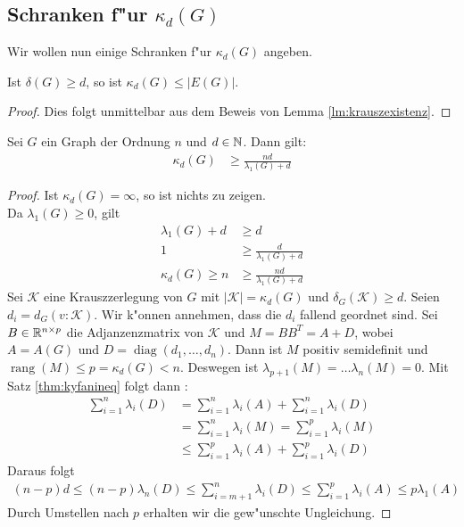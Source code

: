 \subsection{Schranken f"ur $\kappa_d(G)$}

Wir wollen nun einige Schranken f"ur $\kappa_{d}(G)$ angeben. 
\begin{lemma}
  Ist $\delta(G) \geq d$, so ist $\kappa_{d}(G) \leq |E(G)|$. 
\end{lemma}
\begin{proof}
  Dies folgt unmittelbar aus dem Beweis von Lemma \ref{lm:krauszexistenz}. 
\end{proof}

\begin{theorem}
  Sei $G$ ein Graph der Ordnung $n$ und $d\in {\mathbb{N}}$. Dann gilt:
  \begin{align*}
    \kappa_{d}(G) &\geq \frac{nd}{\lambda_{1}(G) +d} 
  \end{align*}
  \label{thm:kappaineq1}
\end{theorem}

\begin{proof}
  Ist $\kappa_{d}(G) = \infty$, so ist nichts zu zeigen. \\
   Da $\lambda_{1}(G) \geq 0$, gilt 
  \begin{align*}
    \lambda_{1}(G) + d &\geq d \\
    1 &\geq \frac{d}{\lambda_{1}(G) + d }\\
    \kappa_{d}(G) \geq n &\geq \frac{nd}{\lambda_{1}(G)+d}
  \end{align*}
  Sei $\mathcal{K}$ eine Krauszzerlegung von $G$ mit $|\mathcal{K}| = \kappa_{d}(G)$ und $\delta_{G}(\mathcal{K}) \geq d$. Seien $d_{i} = d_{G}(v:\mathcal{K})$. Wir k"onnen annehmen, dass die $d_{i}$ fallend geordnet sind. Sei $B\in {\mathbb{R}}^{n\times p}$ die Adjanzenzmatrix von $\mathcal{K}$ und $M = BB^{T} = A+D$, wobei $A= A(G)$ und $D = \operatorname{diag}(d_{1},\dots,d_n)$.
  Dann ist $M$ positiv semidefinit und $\operatorname{rang} (M) \leq p = \kappa_{d}(G) < n $. Deswegen ist $\lambda_{p+1}(M) = \dots \lambda_{n}(M) = 0$. 
    Mit Satz \ref{thm:kyfanineq} folgt dann : 
  \begin{align*}
    \sum\limits_{i=1}^{n} \lambda_{i}(D) &=\sum\limits_{i=1}^{n} \lambda_{i}(A) +\sum\limits_{i=1}^{n}  \lambda_{i}(D) \\
    &=\sum\limits_{i=1}^{n} \lambda_{i}(M) =\sum\limits_{i=1}^{p} \lambda_{i}(M) \\
    &\leq \sum\limits_{i=1}^{p} \lambda_{i}(A) +\sum\limits_{i=1}^{p} \lambda_{i}(D)
  \end{align*}
  Daraus folgt 
  \begin{align*}
    (n-p) d \leq (n-p) \lambda_n(D) \leq \sum\limits_{i=m+1}^{n} \lambda_{i}(D) \leq\sum\limits_{i=1}^{p} \lambda_{i}(A) \leq p\lambda_{1}(A)
  \end{align*}
  Durch Umstellen nach $p$ erhalten wir die gew"unschte Ungleichung.
\end{proof}

